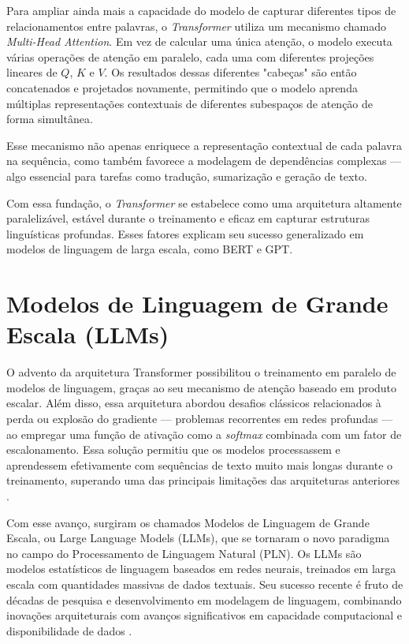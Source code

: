 Para ampliar ainda mais a capacidade do modelo de capturar diferentes tipos de relacionamentos entre palavras, o \textit{Transformer} utiliza um mecanismo chamado \textit{Multi-Head Attention}. Em vez de calcular uma única atenção, o modelo executa várias operações de atenção em paralelo, cada uma com diferentes projeções lineares de $Q$, $K$ e $V$. Os resultados dessas diferentes "cabeças" são então concatenados e projetados novamente, permitindo que o modelo aprenda múltiplas representações contextuais de diferentes subespaços de atenção de forma simultânea.

Esse mecanismo não apenas enriquece a representação contextual de cada palavra na sequência, como também favorece a modelagem de dependências complexas — algo essencial para tarefas como tradução, sumarização e geração de texto.

Com essa fundação, o \textit{Transformer } se estabelece como uma arquitetura altamente paralelizável, estável durante o treinamento e eficaz em capturar estruturas linguísticas profundas. Esses fatores explicam seu sucesso generalizado em modelos de linguagem de larga escala, como BERT e GPT.

\section{Modelos de Linguagem de Grande Escala (LLMs)}
\label{sec:modelos-de-linguagem-de-grande-escala}

O advento da arquitetura Transformer possibilitou o treinamento em paralelo de modelos de linguagem, graças ao seu mecanismo de atenção baseado em produto escalar. Além disso, essa arquitetura abordou desafios clássicos relacionados à perda ou explosão do gradiente — problemas recorrentes em redes profundas — ao empregar uma função de ativação como a \textit{softmax} combinada com um fator de escalonamento. Essa solução permitiu que os modelos processassem e aprendessem efetivamente com sequências de texto muito mais longas durante o treinamento, superando uma das principais limitações das arquiteturas anteriores \cite{vaswani_attention_2017}.

Com esse avanço, surgiram os chamados Modelos de Linguagem de Grande Escala, ou Large Language Models (LLMs), que se tornaram o novo paradigma no campo do Processamento de Linguagem Natural (PLN). Os LLMs são modelos estatísticos de linguagem baseados em redes neurais, treinados em larga escala com quantidades massivas de dados textuais. Seu sucesso recente é fruto de décadas de pesquisa e desenvolvimento em modelagem de linguagem, combinando inovações arquiteturais com avanços significativos em capacidade computacional e disponibilidade de dados \cite{wu_multimodal_2023, brown_language_2020}.

